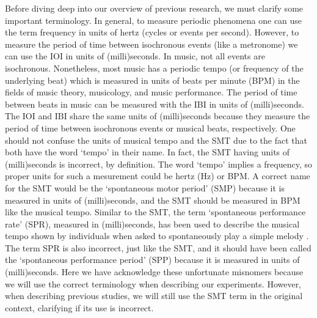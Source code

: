\documentclass{report}
\begin{document}
Before diving deep into our overview of previous research, we must clarify some important terminology. In general, to measure periodic phenomena one can use the term frequency in units of hertz (cycles or events per second). However, to measure the period of time between isochronous events (like a metronome) we can use the IOI in units of (milli)seconds. In music, not all events are isochronous. Nonetheless, most music has a periodic tempo (or frequency of the underlying beat) which is measured in units of beats per minute (BPM) in the fields of music theory, musicology, and music performance. The period of time between beats in music can be measured with the IBI in units of (milli)seconds. The IOI and IBI share the same units of (milli)seconds because they measure the period of time between isochronous events or musical beats, respectively. One should not confuse the units of musical tempo and the SMT due to the fact that both have the word `tempo' in their name. In fact, the SMT having units of (milli)seconds is incorrect, by definition. The word `tempo' implies a frequency, so proper units for such a mesurement could be hertz (Hz) or BPM. A correct name for the SMT would be the `spontaneous motor period' (SMP) because it is measured in units of (milli)seconds, and the SMT should be measured in BPM like the musical tempo. Similar to the SMT, the term `spontaneous performance rate' (SPR), measured in (milli)seconds, has been used to describe the musical tempo shown by individuals when asked to spontaneously play a simple melody \cite{zamm2016endogenous}. The term SPR is also incorrect, just like the SMT, and it should have been called the `spontaneous performance period' (SPP) because it is measured in units of (milli)seconds. Here we have acknowledge these unfortunate misnomers because we will use the correct terminology when describing our experiments. However, when describing previous studies, we will still use the SMT term in the original context, clarifying if its use is incorrect. 
\end{document}
